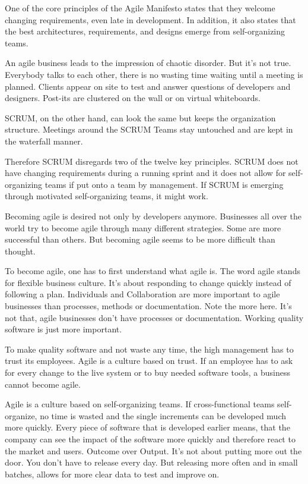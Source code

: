 One of the core principles of the Agile Manifesto states that they welcome changing requirements, even late in development. In addition, it also states that the best architectures, requirements, and designs emerge from self-organizing teams.

An agile business leads to the impression of chaotic disorder. But it's not true. Everybody talks to each other, there is no wasting time waiting until a meeting is planned. Clients appear on site to test and answer questions of developers and designers. Post-its are clustered on the wall or on virtual whiteboards. 

SCRUM, on the other hand, can look the same but keeps the organization structure. Meetings around the SCRUM Teams stay untouched and are kept in the waterfall manner.

Therefore SCRUM disregards two of the twelve key principles. SCRUM does not have changing requirements during a running sprint and it does not allow for self-organizing teams if put onto a team by management. If SCRUM is emerging through motivated self-organizing teams, it might work. 

Becoming agile is desired not only by developers anymore. Businesses all over the world try to become agile through many different strategies. Some are more successful than others. But becoming agile seems to be more difficult than thought.

To become agile, one has to first understand what agile is. The word agile stands for flexible business culture. It's about responding to change quickly instead of following a plan. Individuals and Collaboration are more important to agile businesses than processes, methods or documentation. Note the more here. It's not that, agile businesses don't have processes or documentation. Working quality software is just more important. 

To make quality software and not waste any time, the high management has to trust its employees. Agile is a culture based on trust. If an employee has to ask for every change to the live system or to buy needed software tools, a business cannot become agile.

Agile is a culture based on self-organizing teams. If cross-functional teams self-organize, no time is wasted and the single increments can be developed much more quickly. Every piece of software that is developed earlier means, that the company can see the impact of the software more quickly and therefore react to the market and users. Outcome over Output. It's not about putting more out the door. You don't have to release every day. But releasing more often and in small batches, allows for more clear data to test and improve on.

